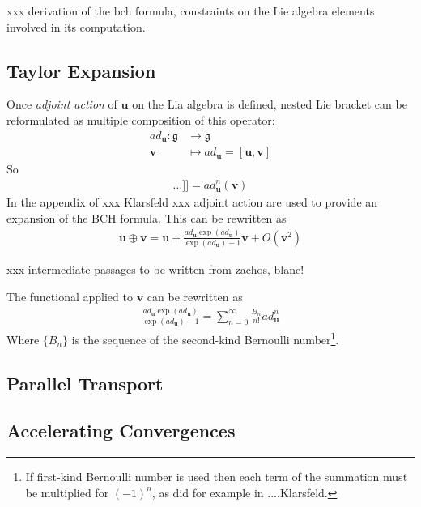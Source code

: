 \noindent
xxx derivation of the bch formula, constraints on the Lie algebra elements involved in its computation.

\subsection{Taylor Expansion}



Once \emph{adjoint action} of $\mathbf{u}$ on the Lia algebra is defined, nested Lie bracket can be reformulated as multiple composition of this operator:
\begin{align*}
	ad_{\mathbf{u}} : \mathfrak{g}  & \longrightarrow \mathfrak{g}  
	\\
	\mathbf{v} &\longmapsto ad_{\mathbf{u}}   =  [\mathbf{u}, \mathbf{v}]
\end{align*}
So
\begin{align*}
	[  \underbrace{   \mathbf{u},[\mathbf{u},... [\mathbf{u}}_{\text{n-times}},\mathbf{v}]...]] =  ad_{\mathbf{u}}^{n}(\mathbf{v})
\end{align*}
In the appendix of xxx Klarsfeld xxx adjoint action are used to provide an expansion of the BCH formula. This can be rewritten as
\begin{align*}
	\mathbf{u}\oplus \mathbf{v}  = \mathbf{u} + \frac{ ad_{\mathbf{u}} \exp(ad_{\mathbf{u}}) }{ \exp(ad_{\mathbf{u}}) - 1 }  \mathbf{v} + O({\mathbf{v}}^2)
\end{align*}

\noindent
xxx intermediate passages to be written from zachos, blane!

The functional applied to $\mathbf{v}$ can be rewritten as
\begin{align*}
	\frac{ ad_{\mathbf{u}} \exp(ad_{\mathbf{u}}) }{ \exp(ad_{\mathbf{u}}) - 1 }  = \sum_{n=0}^{\infty} \frac{B_{n}}{n!} ad_{\mathbf{u}}^{n} 
\end{align*}
Where $\lbrace B_{n} \rbrace $ is the sequence of the second-kind Bernoulli number\footnote{If first-kind Bernoulli number is used then each term of the summation must be multiplied for $(-1)^{n}$, as did for example in ....Klarsfeld.}.

\subsection{Parallel Transport}




\subsection{Accelerating Convergences}
